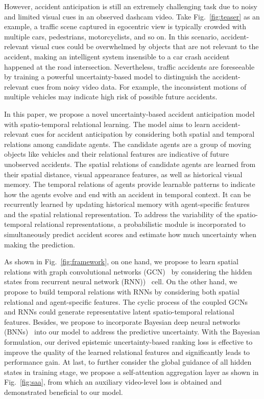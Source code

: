 \documentclass[sigconf]{acmart}
\begin{document}
However, accident anticipation is still an extremely challenging task due to noisy and limited visual cues in an observed dashcam video. Take Fig.~\ref{fig:teaser} as an example, a traffic scene captured in egocentric view is typically crowded with multiple cars, pedestrians, motorcyclists, and so on. In this scenario, accident-relevant visual cues could be overwhelmed by objects that are not relevant to the accident, making an intelligent system insensible to a car crash accident happened at the road intersection. Nevertheless, traffic accidents are foreseeable by training a powerful uncertainty-based model to distinguish the accident-relevant cues from noisy video data. For example, the inconsistent motions of multiple vehicles may indicate high risk of possible future accidents.

In this paper, we propose a novel uncertainty-based accident anticipation model with spatio-temporal relational learning. The model aims to learn accident-relevant cues for accident anticipation by considering both spatial and temporal relations among candidate agents. The candidate agents are a group of moving objects like vehicles and their relational features are indicative of future unobserved accidents. The spatial relations of candidate agents are learned from their spatial distance, visual appearance features, as well as historical visual memory. The temporal relations of agents provide learnable patterns to indicate how the agents evolve and end with an accident in temporal context. It can be recurrently learned by updating historical memory with agent-specific features and the spatial relational representation. To address the variability of the spatio-temporal relational representations, a probabilistic module is incorporated to simultaneously predict accident scores and estimate how much uncertainty when making the prediction.

As shown in Fig.~\ref{fig:framework}, on one hand, we propose to learn spatial relations with graph convolutional networks (GCN)~\cite{DefferrardNIPS2016,KipfICLR2017} by considering the hidden states from recurrent neural network (RNN))~\cite{LiptonArXiv2015,SeoICLR2017} cell. On the other hand, we propose to build temporal relations with RNNs by considering both spatial relational and agent-specific features. The cyclic process of the coupled GCNs and RNNs could generate representative latent spatio-temporal relational features. Besides, we propose to incorporate Bayesian deep neural networks (BNNs)~\cite{DenkerNIPS1990,NealBook2012} into our model to address the predictive uncertainty. With the Bayesian formulation, our derived epistemic uncertainty-based ranking loss is effective to improve the quality of the learned relational features and significantly leads to performance gain. At last, to further consider the global guidance of all hidden states in training stage, we propose a self-attention aggregation layer as shown in Fig.~\ref{fig:saa}, from which an auxiliary video-level loss is obtained and demonstrated beneficial to our model.
\end{document}
